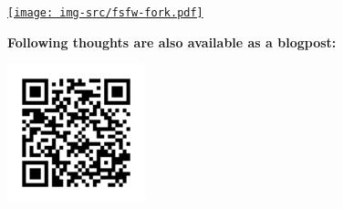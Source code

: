 \documentclass[t]{beamer}
\begin{document}
\begin{frame}[label=ct4,plain]{}

\vspace{1mm}
\begin{center}
\href{https://fsfw-dresden.de/fork}{
\texttt{[image: img-src/fsfw-fork.pdf]}}
\end{center}


\end{frame}


\begin{frame}[label=ct5]{}

\begin{center}
\textbf{Following thoughts are also available as a blogpost:}

\vspace{10mm}

\vspace{10mm}

\includegraphics[width=0.3\textwidth]{img-src/qr-code-funding-foss.png}

\end{center}
\end{frame}

\newlength{\breite}
\end{document}
